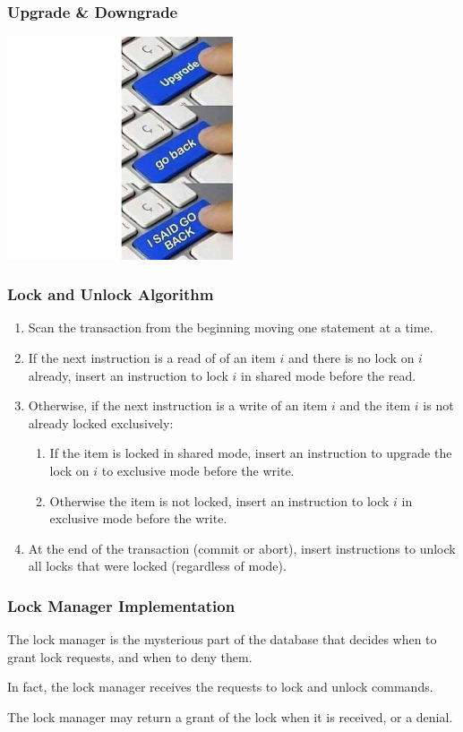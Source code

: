 \begin{frame}
\frametitle{Upgrade \& Downgrade}

\begin{center}
	\includegraphics[width=0.5\textwidth]{images/upgrade.jpg}
\end{center}


\end{frame}

\begin{frame}
\frametitle{Lock and Unlock Algorithm}

\begin{enumerate}
	\item Scan the transaction from the beginning moving one statement at a time.
	\item If the next instruction is a read of of an item $i$ and there is no lock on $i$ already, insert an instruction to lock $i$ in shared mode before the read.
	\item Otherwise, if the next instruction is a write of an item $i$ and the item $i$ is not already locked exclusively:
		\begin{enumerate}
			\item If the item is locked in shared mode, insert an instruction to upgrade the lock on $i$ to exclusive mode before the write.
			\item Otherwise the item is not locked, insert an instruction to lock $i$ in exclusive mode before the write.
		\end{enumerate}
	\item At the end of the transaction (commit or abort), insert instructions to unlock all locks that were locked (regardless of mode).
\end{enumerate}


\end{frame}

\begin{frame}
\frametitle{Lock Manager Implementation}

The lock manager is the mysterious part of the database that decides when to grant lock requests, and when to deny them. 

In fact, the lock manager receives the requests to lock and unlock commands. 

The lock manager may return a grant of the lock when it is received, or a denial.


\end{frame}

